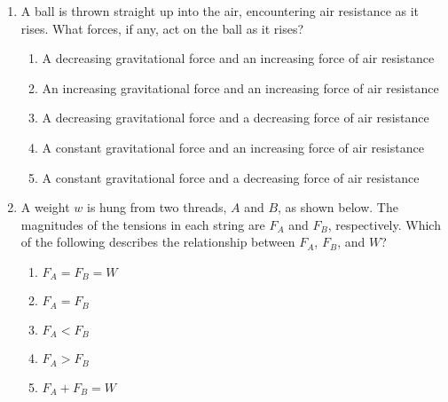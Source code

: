 \documentclass{../../../oss-apphys}
\begin{document}
\begin{multicols}{2}
\begin{enumerate}[resume,leftmargin=18pt]

  \item A ball is thrown straight up into the air, encountering air resistance
    as it rises. What forces, if any, act on the ball as it rises?
    \begin{enumerate}[nosep,leftmargin=18pt,label=(\Alph*)]
    \item A decreasing gravitational force and an increasing force of air
      resistance
    \item An increasing gravitational force and an increasing force of air
      resistance
    \item A decreasing gravitational force and a decreasing force of air
      resistance
    \item A constant gravitational force and an increasing force of air
      resistance
    \item A constant gravitational force and a decreasing force of air
      resistance
    \end{enumerate}
    \vspace{.65in}
    
  \item A weight $w$ is hung from two threads, $A$ and $B$, as shown below. The
    magnitudes of the tensions in each string are $F_A$ and $F_B$, respectively.
    Which of the following describes the relationship between $F_A$, $F_B$, and
    $W$?
    \begin{center}
    \end{center}
    \begin{enumerate}[nosep,leftmargin=18pt,label=(\Alph*)]
    \item $F_A=F_B=W$
    \item $F_A=F_B$
    \item $F_A<F_B$
    \item $F_A>F_B$
    \item $F_A+F_B=W$
    \end{enumerate}
  

\end{enumerate}
\end{multicols}
\end{document}
